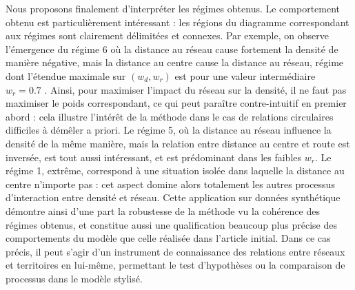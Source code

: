 {}{
Nous proposons finalement d'interpréter les régimes obtenus. Le comportement obtenu est particulièrement intéressant : les régions du diagramme correspondant aux régimes sont clairement délimitées et connexes. Par exemple, on observe l'émergence du régime 6 où la distance au réseau cause fortement la densité de manière négative, mais la distance au centre cause la distance au réseau, régime dont l'étendue maximale sur $(w_d,w_r)$ est pour une valeur intermédiaire $w_r=0.7$ . Ainsi, pour maximiser l'impact du réseau sur la densité, il ne faut pas maximiser le poids correspondant, ce qui peut paraître contre-intuitif en premier abord : cela illustre l'intérêt de la méthode dans le cas de relations circulaires difficiles à démêler a priori. Le régime 5, où la distance au réseau influence la densité de la même manière, mais la relation entre distance au centre et route est inversée, est tout aussi intéressant, et est prédominant dans les faibles $w_r$. Le régime 1, extrême, correspond à une situation isolée dans laquelle la distance au centre n'importe pas : cet aspect domine alors totalement les autres processus d'interaction entre densité et réseau. Cette application sur données synthétique  démontre ainsi d'une part la robustesse de la méthode vu la cohérence des régimes obtenus, et constitue aussi une qualification beaucoup plus précise des comportements du modèle que celle réalisée dans l'article initial. Dans ce cas précis, il peut s'agir d'un instrument de connaissance des relations entre réseaux et territoires en lui-même, permettant le test d'hypothèses ou la comparaison de processus dans le modèle stylisé. 
}














